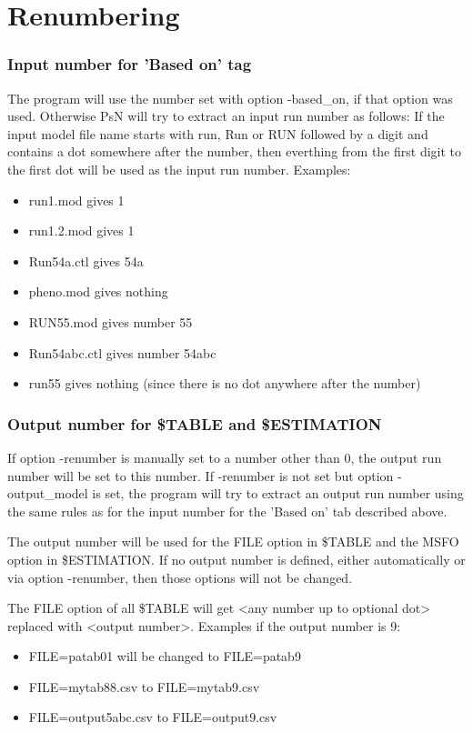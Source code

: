 \section{Renumbering}
\subsubsection*{Input number for 'Based on' tag}
The program will use the number set with option -based\_on, if that option was used.
Otherwise PsN will try to extract an input run number as follows: If the input model file name
starts with run, Run or RUN followed by a digit and contains a dot 
somewhere after the number, then everthing from the first digit to the first dot will be used as the input run number. Examples:
\begin{itemize}
\item run1.mod gives 1
\item run1.2.mod gives 1
\item Run54a.ctl gives 54a
\item pheno.mod gives nothing
\item RUN55.mod gives number 55
\item Run54abc.ctl gives number 54abc
\item run55 gives nothing (since there is no dot anywhere after the number)
\end{itemize}
\subsubsection*{Output number for \$TABLE and \$ESTIMATION}
If option -renumber is manually set to a number other than 0, the output run number will
be set to this number. If -renumber is not set but option -output\_model is set,
the program will try to extract an output run number using the same rules
as for the input number for the 'Based on' tab described above.

The output number will be used for the FILE option in \$TABLE and the MSFO option in
\$ESTIMATION. If no output number is defined, either automatically or via option -renumber, 
then those options will not be changed.

The FILE option of all \$TABLE will get <any number up to optional dot> replaced with <output number>. 
Examples if the output number is 9:
\begin{itemize}
\item FILE=patab01 will be changed to FILE=patab9
\item FILE=mytab88.csv to FILE=mytab9.csv
\item FILE=output5abc.csv to FILE=output9.csv
\end{itemize}

